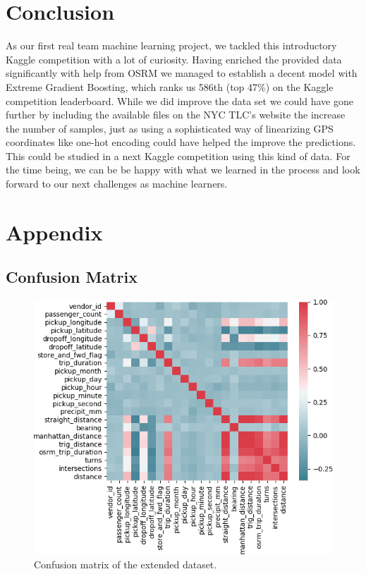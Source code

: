 \documentclass[a4paper]{article}
\begin{document}
\section{Conclusion}
As our first real team machine learning project, we tackled this introductory
Kaggle competition with a lot of curiosity. Having enriched the provided data
significantly with help from OSRM we managed to establish a decent model with
Extreme Gradient Boosting, which ranks us 586th (top 47\%) on the Kaggle
competition leaderboard. While we did improve the data set we could have gone
further by including the available files on the NYC TLC’s website the increase
the number of samples, just as using a sophisticated way of linearizing GPS
coordinates like one-hot encoding could have helped the improve the predictions.
This could be studied in a next Kaggle competition using this kind of data. For
the time being, we can be be happy with what we learned in the process and look
forward to our next challenges as machine learners.

\appendix
\newpage
\section{Appendix}

\subsection{Confusion Matrix}
\begin{figure}[h!]
    \centering
    \includegraphics[width=0.8\linewidth]{confusion}
    \caption{Confusion matrix of the extended dataset.}
    \label{confusion}
\end{figure}
\end{document}
